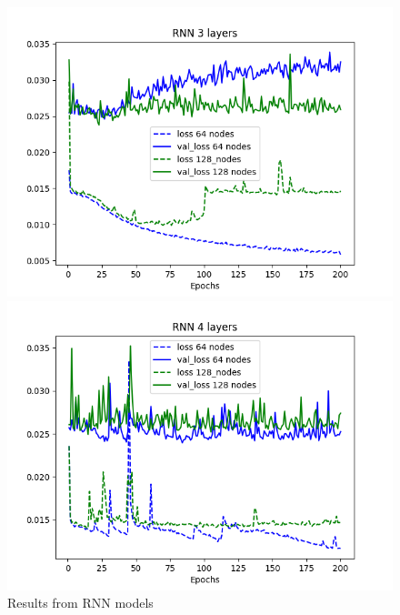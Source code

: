 \documentclass[11pt]
{article}
\begin{document}
\begin{figure}[H]
\begin{minipage}[b]{0.33\linewidth}
		\includegraphics[width=\linewidth]{../TESTS_RESULTS/RNN_tests/plots/3_comp.png} 
	\end{minipage}%
	\begin{minipage}[b]{0.33\linewidth}
		\centering
		\includegraphics[width=\linewidth]{../TESTS_RESULTS/RNN_tests/plots/4_comp.png} 
	\end{minipage} 
	\caption{Results from RNN models} 
\end{figure}
\end{document}
